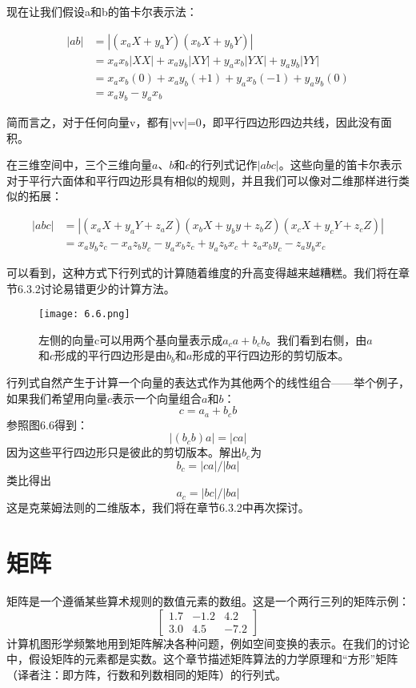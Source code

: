 \documentclass[lang=cn,12pt]{elegantbook}
\begin{document}
现在让我们假设a和b的笛卡尔表示法：

\begin{align}
|ab| &= |(x_aX + y_aY)(x_bX + y_bY)| \nonumber\\
&=x_ax_b|XX|+x_ay_b|XY|+y_ax_b|YX|+y_ay_b|YY| \nonumber\\
&=x_ax_b(0)+x_ay_b(+1)+y_ax_b(-1)+y_ay_b(0) \nonumber\\
& = x_a y_b - y_a x_b \nonumber
\end{align}

简而言之，对于任何向量v，都有|vv|=0，即平行四边形四边共线，因此没有面积。

在三维空间中，三个三维向量$a$、$b$和$c$的行列式记作$|abc|$。这些向量的笛卡尔表示对于平行六面体和平行四边形具有相似的规则，并且我们可以像对二维那样进行类似的拓展：

\begin{align}
|abc| &= |(x_aX+y_aY+z_aZ)(x_bX+y_by+z_bZ)(x_cX+y_cY+z_cZ)| \nonumber\\
&=x_ay_bz_c-x_az_by_c-y_ax_bz_c+y_az_bx_c+z_ax_by_c-z_ay_bx_c \nonumber
\end{align}

可以看到，这种方式下行列式的计算随着维度的升高变得越来越糟糕。我们将在章节6.3.2讨论易错更少的计算方法。


\begin{figure}[htbp]
\centering
\texttt{[image: 6.6.png]}
\caption{左侧的向量c可以用两个基向量表示成$a_ca+b_cb$。我们看到右侧，由$a$和$c$形成的平行四边形是由$b_b$和$a$形成的平行四边形的剪切版本。}
\end{figure}

行列式自然产生于计算一个向量的表达式作为其他两个的线性组合——举个例子，如果我们希望用向量$c$表示一个向量组合$a$和$b$：$$c = a_a + b_cb$$参照图6.6得到：$$|(b_cb)a| = |ca|$$因为这些平行四边形只是彼此的剪切版本。解出$b_c$为$$b_c = |ca|/|ba|$$类比得出$$a_c = |bc|/|ba|$$这是克莱姆法则的二维版本，我们将在章节6.3.2中再次探讨。

\section{矩阵}

矩阵是一个遵循某些算术规则的数值元素的数组。这是一个两行三列的矩阵示例：
$$
\left[\begin{array}{rrr}
1.7 & -1.2 & 4.2 \\
3.0 & 4.5 & -7.2
\end{array}\right]
$$
计算机图形学频繁地用到矩阵解决各种问题，例如空间变换的表示。在我们的讨论中，假设矩阵的元素都是实数。这个章节描述矩阵算法的力学原理和“方形”矩阵（译者注：即方阵，行数和列数相同的矩阵）的行列式。
\end{document}
